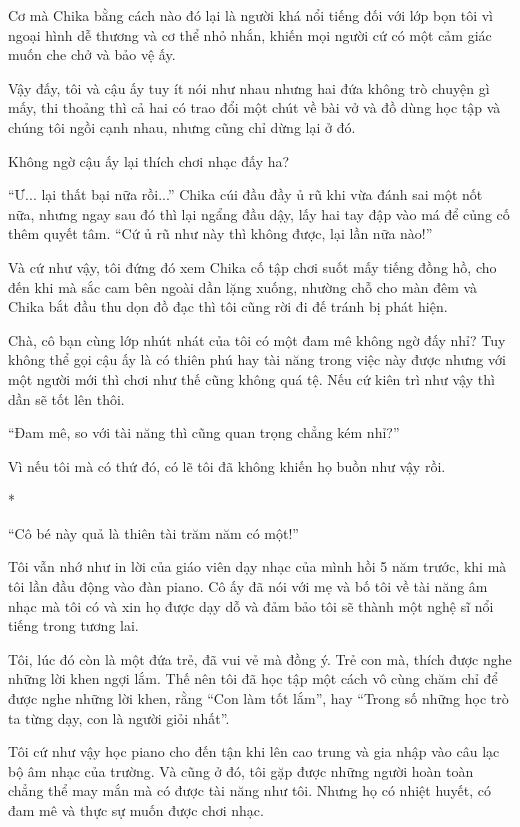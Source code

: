 {Cơ mà Chika bằng cách nào đó lại là người khá nổi tiếng đối với lớp bọn
tôi vì ngoại hình dễ thương và cơ thể nhỏ nhắn, khiến mọi người cứ có
một cảm giác muốn che chở và bảo vệ ấy.

Vậy đấy, tôi và cậu ấy tuy ít nói như nhau nhưng hai đứa không trò
chuyện gì mấy, thi thoảng thì cả hai có trao đổi một chút về bài vở và
đồ dùng học tập và chúng tôi ngồi cạnh nhau, nhưng cũng chỉ dừng lại ở
đó.

Không ngờ cậu ấy lại thích chơi nhạc đấy ha?

``Ư... lại thất bại nữa rồi...'' Chika cúi đầu đầy ủ rũ khi vừa đánh sai
một nốt nữa, nhưng ngay sau đó thì lại ngẩng đầu dậy, lấy hai tay đập
vào má để củng cố thêm quyết tâm. ``Cứ ủ rũ như này thì không được, lại
lần nữa nào!''

Và cứ như vậy, tôi đứng đó xem Chika cố tập chơi suốt mấy tiếng đồng hồ,
cho đến khi mà sắc cam bên ngoài dần lặng xuống, nhường chỗ cho màn đêm
và Chika bắt đầu thu dọn đồ đạc thì tôi cũng rời đi đế tránh bị phát
hiện.

Chà, cô bạn cùng lớp nhút nhát của tôi có một đam mê không ngờ đấy nhỉ?
Tuy không thể gọi cậu ấy là có thiên phú hay tài năng trong việc này
được nhưng với một người mới thì chơi như thế cũng không quá tệ. Nếu cứ
kiên trì như vậy thì dần sẽ tốt lên thôi.

``Đam mê, so với tài năng thì cũng quan trọng chẳng kém nhỉ?''

Vì nếu tôi mà có thứ đó, có lẽ tôi đã không khiến họ buồn như vậy rồi.

*

``Cô bé này quả là thiên tài trăm năm có một!''

Tôi vẫn nhớ như in lời của giáo viên dạy nhạc của mình hồi 5 năm trước,
khi mà tôi lần đầu động vào đàn piano. Cô ấy đã nói với mẹ và bố tôi về
tài năng âm nhạc mà tôi có và xin họ được dạy dỗ và đảm bảo tôi sẽ thành
một nghệ sĩ nổi tiếng trong tương lai.

Tôi, lúc đó còn là một đứa trẻ, đã vui vẻ mà đồng ý. Trẻ con mà, thích
được nghe những lời khen ngợi lắm. Thế nên tôi đã học tập một cách vô
cùng chăm chỉ để được nghe những lời khen, rằng ``Con làm tốt lắm'', hay
``Trong số những học trò ta từng dạy, con là người giỏi nhất''.

Tôi cứ như vậy học piano cho đến tận khi lên cao trung và gia nhập vào
câu lạc bộ âm nhạc của trường. Và cũng ở đó, tôi gặp được những người
hoàn toàn chẳng thể may mắn mà có được tài năng như tôi. Nhưng họ có
nhiệt huyết, có đam mê và thực sự muốn được chơi nhạc.

}

